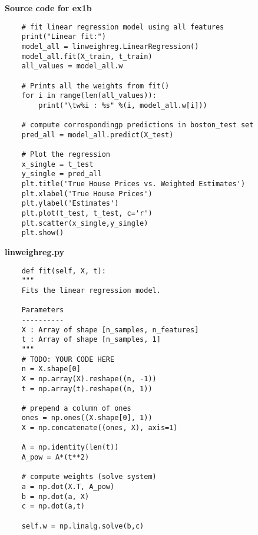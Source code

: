 \textbf{Source code for ex1b}
\begin{lstlisting}
    # fit linear regression model using all features
    print("Linear fit:")
    model_all = linweighreg.LinearRegression()
    model_all.fit(X_train, t_train)
    all_values = model_all.w

    # Prints all the weights from fit() 
    for i in range(len(all_values)):
        print("\tw%i : %s" %(i, model_all.w[i]))

    # compute corrospondingp predictions in boston_test set
    pred_all = model_all.predict(X_test)

    # Plot the regression
    x_single = t_test
    y_single = pred_all
    plt.title('True House Prices vs. Weighted Estimates')
    plt.xlabel('True House Prices')
    plt.ylabel('Estimates')
    plt.plot(t_test, t_test, c='r')
    plt.scatter(x_single,y_single)
    plt.show()
\end{lstlisting}

\textbf{linweighreg.py}

\begin{lstlisting}
    def fit(self, X, t):
    """
    Fits the linear regression model.
    
    Parameters
    ----------
    X : Array of shape [n_samples, n_features]
    t : Array of shape [n_samples, 1]
    """        
    # TODO: YOUR CODE HERE
    n = X.shape[0]
    X = np.array(X).reshape((n, -1))
    t = np.array(t).reshape((n, 1))
    
    # prepend a column of ones
    ones = np.ones((X.shape[0], 1))
    X = np.concatenate((ones, X), axis=1)
    
    A = np.identity(len(t))
    A_pow = A*(t**2)
    
    # compute weights (solve system)
    a = np.dot(X.T, A_pow)
    b = np.dot(a, X)
    c = np.dot(a,t)
    
    self.w = np.linalg.solve(b,c)
\end{lstlisting}

